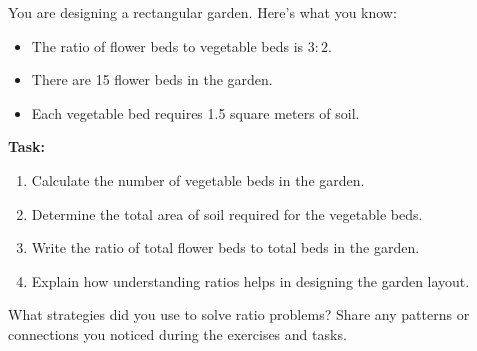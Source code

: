 \documentclass[12pt]{article}
\begin{document}
\begin{tcolorbox}[colframe=black!60, colback=white, 
coltitle=black, colbacktitle=black!15, fonttitle=\bfseries\Large, 
title=Performance Task: Designing a Garden, halign title=center, left=10pt, right=10pt, top=10pt, bottom=80pt]
You are designing a rectangular garden. Here’s what you know:
\begin{itemize}
    \item The ratio of flower beds to vegetable beds is \(3:2\).
    \item There are 15 flower beds in the garden.
    \item Each vegetable bed requires 1.5 square meters of soil.
\end{itemize}

\textbf{Task:}
\begin{enumerate}[itemsep=4em]
    \item Calculate the number of vegetable beds in the garden.
    \item Determine the total area of soil required for the vegetable beds.
    \item Write the ratio of total flower beds to total beds in the garden.
    \item Explain how understanding ratios helps in designing the garden layout.
\end{enumerate}
\end{tcolorbox}

\begin{tcolorbox}[colframe=black!60, colback=white, 
coltitle=black, colbacktitle=black!15, fonttitle=\bfseries\Large, 
title=Reflection, halign title=center, left=10pt, right=10pt, top=10pt, bottom=100pt]
What strategies did you use to solve ratio problems? Share any patterns or connections you noticed during the exercises and tasks.
\end{tcolorbox}
\end{document}
